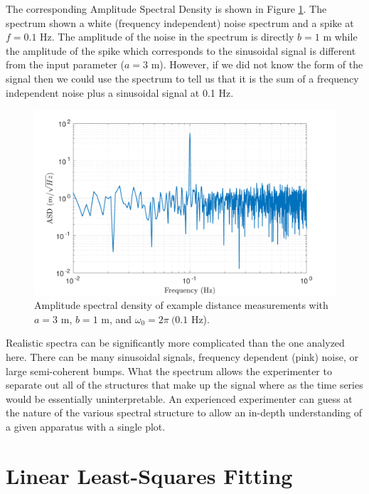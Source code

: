 \documentclass{book}
\begin{document}
The corresponding Amplitude Spectral Density is shown in Figure \ref{SpecASD}. The spectrum shown a white (frequency independent) noise spectrum and a spike at $f=0.1$ Hz. The amplitude of the noise in the spectrum is directly $b = 1$ m while the amplitude of the spike which corresponds to the sinusoidal signal is different from the input parameter ($a=3$ m). However, if we did not know the form of the signal then we could use the spectrum to tell us that it is the sum of a frequency independent noise plus a sinusoidal signal at 0.1 Hz.

\begin{figure}[!h]
\begin{centering}
\includegraphics[width=\textwidth]{SpecASD.pdf}
\caption{Amplitude spectral density of example distance measurements with $a=3$ m, $b=1$ m, and $\omega_0=2\pi\ (0.1$ Hz).}\label{SpecASD}
\end{centering}
\end{figure}

Realistic spectra can be significantly more complicated than the one analyzed here. There can be many sinusoidal signals, frequency dependent (pink) noise, or large semi-coherent bumps. What the spectrum allows the experimenter to separate out all of the structures that make up the signal where as the time series would be essentially uninterpretable. An experienced experimenter can guess at the nature of the various spectral structure to allow an in-depth understanding of a given apparatus with a single plot.


\section{Linear Least-Squares Fitting}



\end{document}
